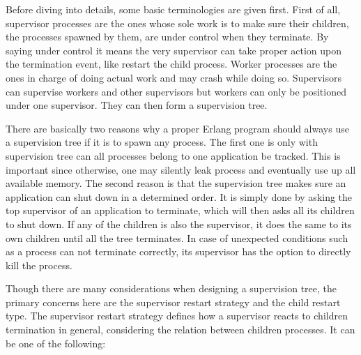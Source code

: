 Before diving into details, some basic terminologies are given first. First of all, supervisor processes are the ones whose sole work is to make sure their children, the processes spawned by them, are under control when they terminate. By saying under control it means the very supervisor can take proper action upon the termination event, like restart the child process. Worker processes are the ones in charge of doing actual work and may crash while doing so. Supervisors can supervise workers and other supervisors but workers can only be positioned under one supervisor. They can then form a supervision tree.

There are basically two reasons why a proper Erlang program should always use a supervision tree if it is to spawn any process. The first one is only with supervision tree can all processes belong to one application be tracked. This is important since otherwise, one may silently leak process and eventually use up all available memory. The second reason is that the supervision tree makes sure an application can shut down in a determined order. It is simply done by asking the top supervisor of an application to terminate, which will then asks all its children to shut down. If any of the children is also the supervisor, it does the same to its own children until all the tree terminates. In case of unexpected conditions such as a process can not terminate correctly, its supervisor has the option to directly kill the process.

Though there are many considerations when designing a supervision tree, the primary concerns here are the supervisor restart strategy and the child restart type. The supervisor restart strategy defines how a supervisor reacts to children termination in general, considering the relation between children processes. It can be one of the following:

